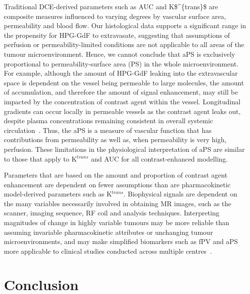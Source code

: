 Traditional DCE-derived parameters such as \acs{AUC} and \acs{K$^{trans}$} are composite measures influenced to varying degrees by vascular surface area, permeability and blood flow.
Our histological data supports a significant range in the propensity for \acs{HPG-GdF} to extravasate, suggesting that assumptions of perfusion or permeability-limited conditions are not applicable to all areas of the tumour microenvironment.
Hence, we cannot conclude that \acs{aPS} is exclusively proportional to permeability-surface area (PS) in the whole microenvironment.
For example, although the amount of \acs{HPG-GdF} leaking into the extravascular space is dependent on the vessel being permeable to large molecules, the amount of accumulation, and therefore the amount of signal enhancement, may still be impacted by the concentration of contrast agent within the vessel.
Longitudinal gradients can occur locally in permeable vessels as the contrast agent leaks out, despite plasma concentrations remaining consistent in overall systemic circulation~\cite{Erickson:2003wt,Dewhirst:1999jh}.
Thus, the \acs{aPS} is a measure of vascular function that has contributions from permeability as well as, when permeability is very high, perfusion.
These limitations in the physiological interpretation of \acs{aPS} are similar to those that apply to K$^{trans}$ and \acs{AUC} for all contrast-enhanced modelling.

Parameters that are based on the amount and proportion of contrast agent enhancement are dependent on fewer assumptions than are pharmacokinetic model-derived parameters such as K$^{trans}$.
Biophysical signals are dependent on the many variables necessarily involved in obtaining MR images, such as the scanner, imaging sequence, RF coil and analysis techniques.
Interpreting magnitudes of change in highly variable tumours may be more reliable than assuming invariable pharmacokinetic attributes or unchanging tumour microenvironments, and may make simplified biomarkers such as \acs{fPV} and \acs{aPS} more applicable to clinical studies conducted across multiple centres~\cite{OConnor:2012ie}.

\section{Conclusion}

